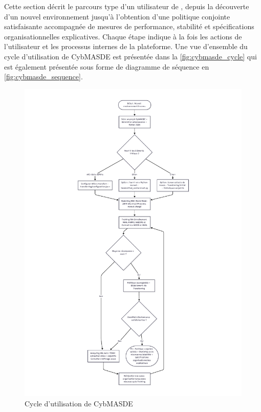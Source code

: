 Cette section décrit le parcours type d’un utilisateur de , depuis la découverte d’un nouvel environnement jusqu’à l’obtention d’une politique conjointe satisfaisante accompagnée de mesures de performance, stabilité et spécifications organisationnelles explicatives. Chaque étape indique à la fois les actions de l’utilisateur et les processus internes de la plateforme. Une vue d’ensemble du cycle d'utilisation de CybMASDE est présentée dans la \autoref{fig:cybmasde_cycle} qui est également présentée sous forme de diagramme de séquence en \autoref{fig:cybmasde_sequence}.

\begin{figure}
    \centering
    \includegraphics[trim={5cm 1cm 5cm 1cm},clip,height=\textheight]{figures/CybMASDE_user_flowchart.pdf}
    \caption{Cycle d’utilisation de CybMASDE}
    \label{fig:cybmasde_cycle}
\end{figure}

